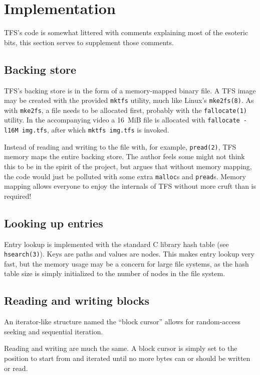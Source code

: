 \documentclass{report}
\begin{document}
\section*{Implementation}

TFS's code is somewhat littered with comments explaining most of the esoteric bits,
this section serves to supplement those comments.

\subsection*{Backing store}

TFS's backing store is in the form of a memory-mapped binary file.
A TFS image may be created with the provided \texttt{mktfs} utility,
much like Linux's \texttt{mke2fs(8)}.
As with \texttt{mke2fs}, a file needs to be allocated first,
probably with the \texttt{fallocate(1)} utility.
In the accompanying video a \qty{16}{MiB} file is allocated with \texttt{fallocate -l16M img.tfs},
after which \texttt{mktfs img.tfs} is invoked.

Instead of reading and writing to the file with, for example, \texttt{pread(2)},
TFS memory maps the entire backing store.
The author feels some might not think this to be in the spirit of the project,
but argues that without memory mapping, the code would just be polluted with
some extra \texttt{malloc}s and \texttt{pread}s.
Memory mapping allows everyone to enjoy the internals of TFS without more cruft than is required!

\subsection*{Looking up entries}

Entry lookup is implemented with the standard C library hash table
(see \texttt{hsearch(3)}).
Keys are paths and values are nodes.
This makes entry lookup very fast, but the memory usage may be a concern for large file systems,
as the hash table size is simply initialized to the number of nodes in the file system.

\subsection*{Reading and writing blocks}

An iterator-like structure named the ``block cursor''
allows for random-access seeking and sequential iteration.

Reading and writing are much the same.
A block cursor is simply set to the position to start from
and iterated until no more bytes can or should be written or read.
\end{document}
